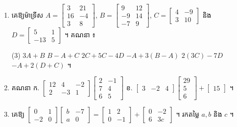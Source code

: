 \begin{enumerate}[1]
  \item គេឱ្យម៉ាទ្រីស $A = \begin{bmatrix} 3 & 21\\ 16 & -4\\ 3 & 8 \end{bmatrix}$, $B = \begin{bmatrix} 9 & 12\\ -9 & 14\\ -7 & 9 \end{bmatrix}$, $C = \begin{bmatrix} 4 & -9\\ 3 & 10 \end{bmatrix}$ និង $D = \begin{bmatrix} 5 & 1\\ -13 & 5 \end{bmatrix}$ ។ គណនា ៖
  \begin{tasks}(3)
    \task $3A + B$
    \task $B - A + C$
    \task $2C + 5C - 4D$
    \task $-A + 3(B - A)$
    \task $2(3C) - 7D$
    \task $-A + 2(D + C)$ ។
  \end{tasks}
  \item គណនា \quad ក. $\begin{bmatrix} 12 & 4 & -2\\ 2 & -3 & 1 \end{bmatrix}\begin{bmatrix} 2 & -1\\ 7 & 4\\ 6 & 5 \end{bmatrix}$ \qquad ខ. $\begin{bmatrix} 3 & -2 & 4 \end{bmatrix}\begin{bmatrix} 29\\ 5\\ 6 \end{bmatrix} + \begin{bmatrix} 15 \end{bmatrix}$ ។
  \item គេឱ្យ $\begin{bmatrix} 0 & 1\\ -2 & 0 \end{bmatrix}\begin{bmatrix} b & -7\\ a & 0 \end{bmatrix} = \begin{bmatrix} 1 & 2\\ 0 & -1 \end{bmatrix} + \begin{bmatrix} 0 & -2\\ 6 & 3c \end{bmatrix}$ ។ រកតម្លៃ $a, b$ និង $c$ ។

\end{enumerate}
